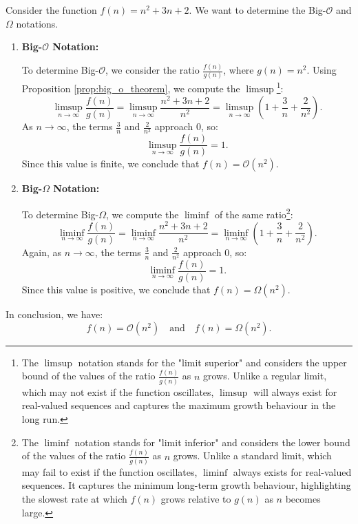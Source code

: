 \begin{example}
    Consider the function \( f(n) = n^2 + 3n + 2 \). We want to determine the Big-$\mathcal{O}$ and $\Omega$ notations.

    \begin{enumerate}
        \item \textbf{Big-$\mathcal{O}$ Notation:}
        
        To determine Big-$\mathcal{O}$, we consider the ratio \( \frac{f(n)}{g(n)} \), where \( g(n) = n^2 \). Using Proposition \ref{prop:big_o_theorem}, we compute the \(\limsup\)\footnote{The \(\limsup\) notation stands for the "limit superior" and considers the upper bound of the values of the ratio $\frac{f(n)}{g(n)}$ as $n$ grows. Unlike a regular limit, which may not exist if the function oscillates, \(\limsup\) will always exist for real-valued sequences and captures the maximum growth behaviour in the long run.}:
        \[
        \limsup_{n \to \infty} \frac{f(n)}{g(n)} = \limsup_{n \to \infty} \frac{n^2 + 3n + 2}{n^2} = \limsup_{n \to \infty} \left( 1 + \frac{3}{n} + \frac{2}{n^2} \right).
        \]
        As \( n \to \infty \), the terms \( \frac{3}{n} \) and \( \frac{2}{n^2} \) approach \( 0 \), so:
        \[
        \limsup_{n \to \infty} \frac{f(n)}{g(n)} = 1.
        \]
        Since this value is finite, we conclude that \( f(n) = \mathcal{O}(n^2) \).

        \item \textbf{Big-$\Omega$ Notation:}
        
        To determine Big-$\Omega$, we compute the \(\liminf\) of the same ratio\footnote{The \(\liminf\) notation stands for "limit inferior" and considers the lower bound of the values of the ratio $\frac{f(n)}{g(n)}$ as $n$ grows. Unlike a standard limit, which may fail to exist if the function oscillates, \(\liminf\) always exists for real-valued sequences. It captures the minimum long-term growth behaviour, highlighting the slowest rate at which $f(n)$ grows relative to $g(n)$ as $n$ becomes large.}:
        \[
        \liminf_{n \to \infty} \frac{f(n)}{g(n)} = \liminf_{n \to \infty} \frac{n^2 + 3n + 2}{n^2} = \liminf_{n \to \infty} \left( 1 + \frac{3}{n} + \frac{2}{n^2} \right).
        \]
        Again, as \( n \to \infty \), the terms \( \frac{3}{n} \) and \( \frac{2}{n^2} \) approach \( 0 \), so:
        \[
        \liminf_{n \to \infty} \frac{f(n)}{g(n)} = 1.
        \]
        Since this value is positive, we conclude that \( f(n) = \Omega(n^2) \).
    \end{enumerate}

    In conclusion, we have:
    \[
    f(n) = \mathcal{O}(n^2) \quad \text{and} \quad f(n) = \Omega(n^2).
    \]
\end{example}

